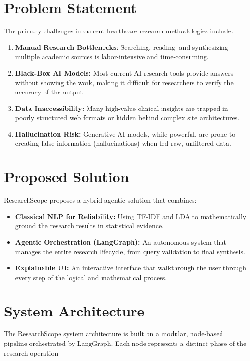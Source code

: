 \documentclass[12pt,a4paper]{article}
\begin{document}
\section{Problem Statement}
The primary challenges in current healthcare research methodologies include:
\begin{enumerate}
    \item \textbf{Manual Research Bottlenecks:} Searching, reading, and synthesizing multiple academic sources is labor-intensive and time-consuming.
    \item \textbf{Black-Box AI Models:} Most current AI research tools provide answers without showing the work, making it difficult for researchers to verify the accuracy of the output.
    \item \textbf{Data Inaccessibility:} Many high-value clinical insights are trapped in poorly structured web formats or hidden behind complex site architectures.
    \item \textbf{Hallucination Risk:} Generative AI models, while powerful, are prone to creating false information (hallucinations) when fed raw, unfiltered data.
\end{enumerate}

\section{Proposed Solution}
ResearchScope proposes a hybrid agentic solution that combines:
\begin{itemize}
    \item \textbf{Classical NLP for Reliability:} Using TF-IDF and LDA to mathematically ground the research results in statistical evidence.
    \item \textbf{Agentic Orchestration (LangGraph):} An autonomous system that manages the entire research lifecycle, from query validation to final synthesis.
    \item \textbf{Explainable UI:} An interactive interface that walkthrough the user through every step of the logical and mathematical process.
\end{itemize}

\section{System Architecture}
The ResearchScope system architecture is built on a modular, node-based pipeline orchestrated by LangGraph. Each node represents a distinct phase of the research operation.
\end{document}
